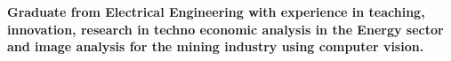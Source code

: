 \vspace{.0cm}
\begingroup
\fontsize{12pt}{14pt}\selectfont
\textbf{
Graduate from Electrical Engineering with experience in teaching, innovation, research in techno economic analysis in the Energy sector and image analysis for the mining industry using computer vision.
}
\endgroup
\sectionsep